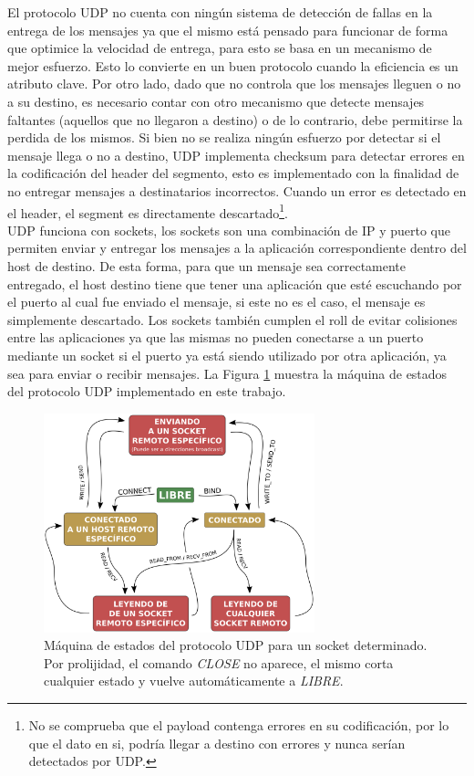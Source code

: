 \documentclass[10pt,a4paper]{article}
\begin{document}
El protocolo UDP no cuenta con ningún sistema de detección de fallas en la entrega de los mensajes ya que el mismo está pensado para funcionar de forma que optimice la velocidad de entrega, para esto se basa en un mecanismo de mejor esfuerzo. Esto lo convierte en un buen protocolo cuando la eficiencia es un atributo clave. Por otro lado, dado que no controla que los mensajes lleguen o no a su destino, es necesario contar con otro mecanismo que detecte mensajes faltantes (aquellos que no llegaron a destino) o de lo contrario, debe permitirse la perdida de los mismos. Si bien no se realiza ningún esfuerzo por detectar si el mensaje llega o no a destino, UDP implementa checksum para detectar errores en la codificación del header del segmento, esto es implementado con la finalidad de no entregar mensajes a destinatarios incorrectos. Cuando un error es detectado en el header, el segment es directamente descartado\footnote{No se comprueba que el payload contenga errores en su codificación, por lo que el dato en si, podría llegar a destino con errores y nunca serían detectados por UDP.}.\\

UDP funciona con sockets, los sockets son una combinación de IP y puerto que permiten enviar y entregar los mensajes a la aplicación correspondiente dentro del host de destino. De esta forma, para que un mensaje sea correctamente entregado, el host destino tiene que tener una aplicación que esté escuchando por el puerto al cual fue enviado el mensaje, si este no es el caso, el mensaje es simplemente descartado. Los sockets también cumplen el roll de evitar colisiones entre las aplicaciones ya que las mismas no pueden conectarse a un puerto mediante un socket si el puerto ya está siendo utilizado por otra aplicación, ya sea para enviar o recibir mensajes. La Figura \ref{figure: UPD state machine} muestra la máquina de estados del protocolo UDP implementado en este trabajo. \\

\begin{figure}[t]
    \centering
    \includegraphics[width = 0.7\textwidth]{img/png/UDP-state-machine.png}
    \caption{Máquina de estados del protocolo UDP para un socket determinado. Por prolijidad, el comando \textit{CLOSE} no aparece, el mismo corta cualquier estado y vuelve automáticamente a \textit{LIBRE}.}
    \label{figure: UPD state machine}
\end{figure}
\end{document}
